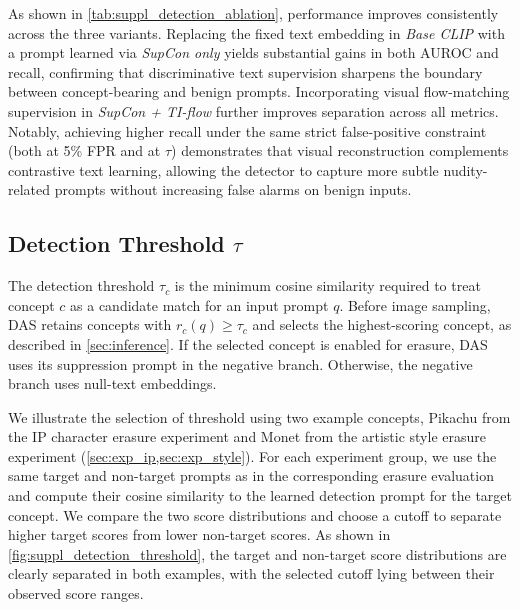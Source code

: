 As shown in \cref{tab:suppl_detection_ablation}, performance improves consistently across the three variants. 
Replacing the fixed text embedding in \emph{Base CLIP} with a prompt learned via \emph{SupCon only} yields 
substantial gains in both AUROC and recall, confirming that discriminative text supervision sharpens the 
boundary between concept-bearing and benign prompts. Incorporating visual flow-matching supervision 
in \emph{SupCon + TI-flow} further improves separation across all metrics. 
Notably, achieving higher recall under the same strict false-positive constraint 
(both at 5\% FPR and at $\tau$) demonstrates that visual reconstruction complements contrastive text learning, 
allowing the detector to capture more subtle nudity-related prompts without increasing false alarms on benign inputs.



\subsection{Detection Threshold \texorpdfstring{$\tau$}{tau}}
\label{sec:suppl_detection_threshold}

The detection threshold $\tau_c$ is the minimum cosine similarity required to treat concept $c$ as a candidate match for an input prompt $q$.
Before image sampling, DAS retains concepts with $r_c(q)\geq\tau_c$ and selects the highest-scoring concept, as described in \cref{sec:inference}.
If the selected concept is enabled for erasure, DAS uses its suppression prompt in the negative branch. Otherwise, the negative branch uses null-text embeddings.

We illustrate the selection of threshold using  two example concepts, Pikachu from the IP character erasure experiment and Monet from the artistic style erasure experiment (\cref{sec:exp_ip,sec:exp_style}).
For each experiment group, we use the same target and non-target prompts as in the corresponding erasure evaluation and compute their cosine similarity to the learned detection prompt for the target concept.
We compare the two score distributions and choose a cutoff to separate higher target scores from lower non-target scores.
As shown in \cref{fig:suppl_detection_threshold}, the target and non-target score distributions are clearly separated in both examples, with the selected cutoff lying between their observed score ranges.

